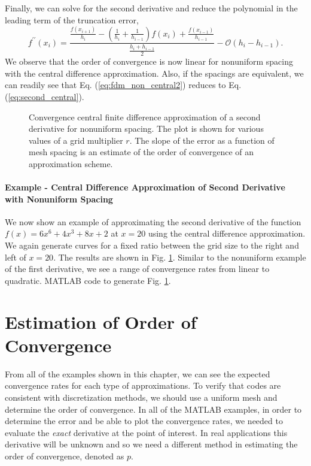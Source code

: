 Finally, we can solve for the second derivative and reduce the polynomial in the leading term of the truncation error,
\begin{equation}
     \boxed{f^{\prime\prime}\left(x_{i}\right) = \frac{\frac{f\left(x_{i+1}\right)}{h_{i}} - 
     \left(\frac{1}{h_{i}} + \frac{1}{h_{i-1}}\right)f\left(x_{i}\right) + \frac{f\left(x_{i-1}\right)}{h_{i-1}}}
     {\frac{h_{i} + h_{i-1}}{2}} - \mathcal{O}\left(h_{i} - h_{i-1}\right).}
  \label{eq:fdm_non_central2}
\end{equation}
We observe that the order of convergence is now linear for nonuniform spacing with the central difference approximation.
Also, if the spacings are equivalent, we can readily see that Eq. (\ref{eq:fdm_non_central2}) reduces to 
Eq. (\ref{eq:second_central}).

\begin{figure}[t]
\sidecaption[t]
\scalebox{0.5}{}
\caption{Convergence central finite difference approximation of  a second derivative for nonuniform spacing. The plot is shown for various values of a grid multiplier $r$. The slope of the error as a function of mesh spacing is an estimate of the order of convergence of an approximation scheme.}
\label{fig:fdm_nonuni_2}
\end{figure}

\paragraph{Example - Central Difference Approximation of Second Derivative with Nonuniform Spacing}
We now show an example of approximating the second derivative of the function $f\left(x\right) = 6x^{6} + 
4x^{3} + 8x + 2$  at $x=20$ using the central difference approximation.  We again generate curves for a fixed
ratio between the grid size to the right and left of $x=20$.  The results are shown in Fig. \ref{fig:fdm_nonuni_2}.
Similar to the nonuniform example of the first derivative, we see a range of convergence rates from linear to quadratic.
MATLAB code to generate Fig. \ref{fig:fdm_nonuni_2}.


\section{Estimation of Order of Convergence}

From all of the examples shown in this chapter, we can see the expected convergence rates for each type of approximations.  To verify that codes are consistent with discretization methods, we should use a uniform mesh and determine the order of convergence.  In all of the MATLAB examples, in order to determine the error and be able to plot
the convergence rates, we needed to evaluate the \emph{exact} derivative at the point of interest.  In real applications
this derivative will be unknown and so we need a different method in estimating the order of convergence, denoted as
$p$.

